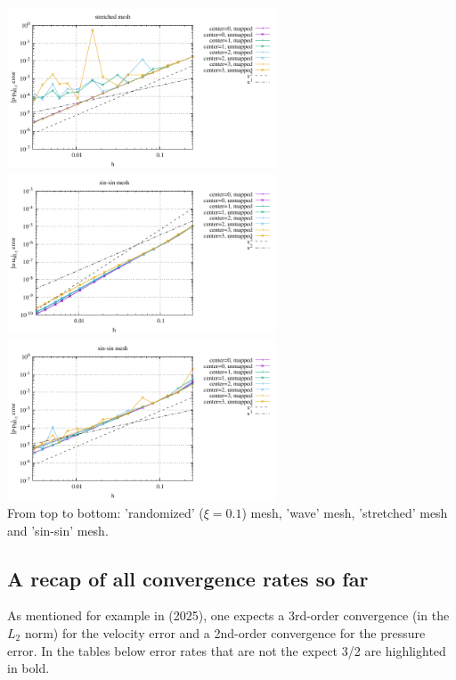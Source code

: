 \begin{center}
\includegraphics[width=8cm]{python_codes/fieldstone_76/results/bench4/curved/errors_P_mt4.pdf}\\
\includegraphics[width=8cm]{python_codes/fieldstone_76/results/bench4/curved/errors_V_mt5.pdf}
\includegraphics[width=8cm]{python_codes/fieldstone_76/results/bench4/curved/errors_P_mt5.pdf} \\
{\captionfont From top to bottom: 'randomized' ($\xi=0.1$) mesh,
'wave' mesh, 'stretched' mesh and 'sin-sin' mesh.}
\end{center}


\newpage
\subsection*{A recap of all convergence rates so far}


As mentioned for example in \textcite{thba25} (2025), 
one expects a 3rd-order convergence (in the $L_2$ norm) for the velocity
error and a 2nd-order convergence for the pressure error.
In the tables below error rates that are not the expect 3/2 are highlighted in bold.


